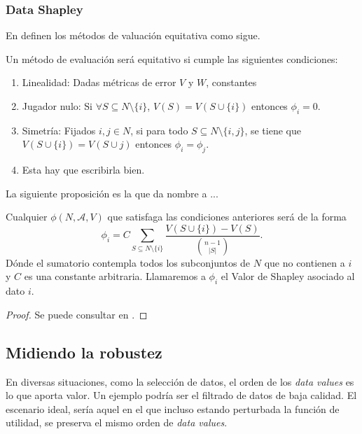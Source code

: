 \subsubsection{Data Shapley}

En {\cite{shapleyValue}} definen los métodos de valuación equitativa
como sigue.

\begin{definition}
  Un método de evaluación será equitativo si cumple las siguientes
  condiciones:
  \begin{enumerate}
    \item Linealidad: Dadas métricas de error $V$ y $W$, constantes
    
    \item Jugador nulo: Si $\forall S \subseteq N \setminus
    \{ i \}$, $V (S) = V (S \cup \{ i \})$ entonces $\phi_i = 0$.
    
    \item Simetría: Fijados $i, j \in N$, si para todo $S \subseteq N
    \setminus \{ i, j \}$, se tiene que $V (S \cup \{ i \}) = V (S \cup j)$
    entonces $\phi_i = \phi_j$.
    
    \item Esta hay que escribirla bien.
  \end{enumerate}
\end{definition}

La siguiente proposición es la que da nombre a ...

\begin{proposition}
  Cualquier $\phi (N, \mathcal{A}, V)$ que satisfaga las condiciones
  anteriores será de la forma
  \[
  \phi_i = C \sum_{S \subseteq N \setminus \{ i \}}
  \frac{V (S \cup \{ i\}) - V (S)}{\binom{n - 1}{| S |}} .
  \]
  Dónde el sumatorio contempla todos los subconjuntos de $N$ que no
  contienen a $i$ y $C$ es una constante arbitraria. Llamaremos a $\phi_i$ el
  Valor de Shapley asociado al dato $i$.
\end{proposition}

\begin{proof}
  Se puede consultar en {\cite{shapleyValue}}.
\end{proof}


\subsection{Midiendo la robustez}

En diversas situaciones, como la selección de datos, el orden
de los \textit{data values} es lo que aporta valor\cite{betaShapley}.
Un ejemplo podría ser el filtrado de datos de baja calidad.
El escenario ideal, sería aquel en el que incluso
estando perturbada la función de utilidad, se preserva
el mismo orden de \textit{data values}.

